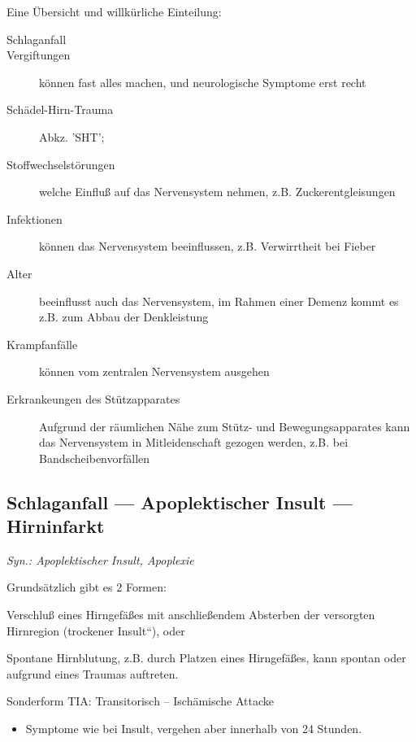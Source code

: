 Eine Übersicht und willkürliche Einteilung:

\begin{description}
    \item [Schlaganfall]
    \item [Vergiftungen] können fast alles machen, und neurologische Symptome erst recht
    \item [Schädel-Hirn-Trauma] Abkz. 'SHT'; 
    \item [Stoffwechselstörungen] welche Einfluß auf das Nervensystem nehmen, z.B. Zuckerentgleisungen 
    \item [Infektionen] können das Nervensystem beeinflussen, z.B. Verwirrtheit bei Fieber
    \item [Alter] beeinflusst auch das Nervensystem, im Rahmen einer Demenz kommt es z.B. zum Abbau der Denkleistung
    \item [Krampfanfälle] können vom zentralen Nervensystem ausgehen
    \item [Erkrankeungen des St\"utzapparates] Aufgrund der räumlichen Nähe zum Stütz- und Bewegungsapparates kann das Nervensystem in Mitleidenschaft gezogen werden, z.B. bei Bandscheibenvorfällen
\end{description}

\subsection{Schlaganfall --- Apoplektischer Insult --- Hirninfarkt}

\emph{Syn.: Apoplektischer Insult, Apoplexie}

Grundsätzlich gibt es 2 Formen:
\begin{description}

    \item[>>Trockener<< Insult] Verschlu{\ss} eines Hirngefä{\ss}es mit anschlie{\ss}endem
    Absterben der versorgten Hirnregion ({\quotedblbase}trockener
    Insult{\textquotedblleft}), oder
    \item[>>Blutiger<< Insult] Spontane Hirnblutung, z.B. durch Platzen eines Hirngefäßes, kann spontan oder aufgrund eines Traumas auftreten.
    \item 
    Sonderform TIA: Transitorisch -- Ischämische Attacke
    \begin{itemize}
        \item Symptome wie bei Insult, vergehen aber innerhalb von 24 Stunden.
    \end{itemize}
\end{description}


